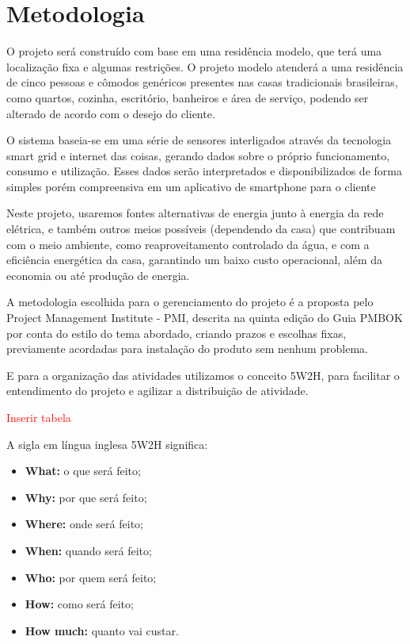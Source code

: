 \chapter{Metodologia}
\par O projeto será construído com base em uma residência modelo, que terá uma localização fixa e algumas restrições. O projeto modelo atenderá a uma residência de cinco pessoas e cômodos genéricos presentes nas casas tradicionais brasileiras, como quartos, cozinha, escritório, banheiros e área de serviço, podendo ser alterado de acordo com o desejo do cliente.
\par O sistema baseia-se em uma série de sensores interligados através da tecnologia smart grid e internet das coisas, gerando dados sobre o próprio funcionamento, consumo e utilização.  Esses dados serão interpretados e disponibilizados de forma simples porém compreensiva em um aplicativo de smartphone  para o cliente
\par Neste projeto, usaremos fontes alternativas de energia junto à energia da rede elétrica, e também outros meios possíveis (dependendo da casa) que contribuam com o meio ambiente, como reaproveitamento controlado da água, e com a eficiência energética da casa, garantindo um baixo custo operacional, além da economia ou até produção de energia.
\par A metodologia escolhida para o gerenciamento do projeto é a proposta pelo Project Management Institute - PMI, descrita na quinta edição do Guia PMBOK por conta do estilo do tema abordado, criando prazos e escolhas fixas, previamente acordadas para instalação do produto sem nenhum problema.
\par E para a organização das atividades utilizamos o conceito 5W2H, para facilitar o entendimento do projeto e agilizar a distribuição de atividade.

\textcolor{red}{Inserir tabela}

\par A sigla em língua inglesa 5W2H significa:
\begin{itemize}
    \item \textbf{What:} o que será feito;
    \item \textbf{Why:} por que será feito;
    \item \textbf{Where:} onde será feito;
    \item \textbf{When:} quando será feito;
    \item \textbf{Who:} por quem será feito;
    \item \textbf{How:} como será feito;
    \item \textbf{How much:} quanto vai custar.
\end{itemize}

